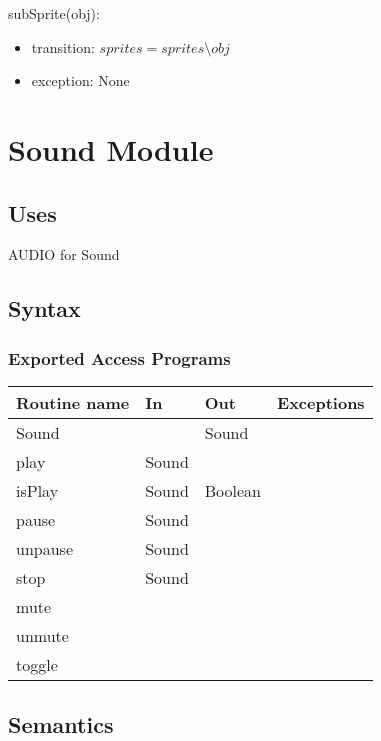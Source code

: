 \documentclass[12pt]{article}
\begin{document}
subSprite(obj):
\begin{itemize}
    \item transition: $ sprites = sprites \setminus obj $
    \item exception: None
\end{itemize}

\newpage

\section*{Sound Module}

\subsection*{Uses}

AUDIO for Sound\\

\subsection*{Syntax}

\subsubsection*{Exported Access Programs}

\begin{tabular}{| l | l | l | l |}
    \hline
    \textbf{Routine name} & \textbf{In} & \textbf{Out} & \textbf{Exceptions}\\
    \hline
    Sound & ~ & Sound & ~\\
    \hline
    play & Sound & ~ & ~\\
    \hline
    isPlay & Sound & Boolean & ~\\
    \hline
    pause & Sound & ~ & ~\\
    \hline
    unpause & Sound & ~ & ~\\
    \hline
    stop & Sound & ~ & ~\\
    \hline
    mute & ~ & ~ & ~\\
    \hline
    unmute & ~ & ~ & ~\\
    \hline
    toggle & ~ & ~ & ~\\
    \hline
\end{tabular}

\subsection* {Semantics}
\end{document}
